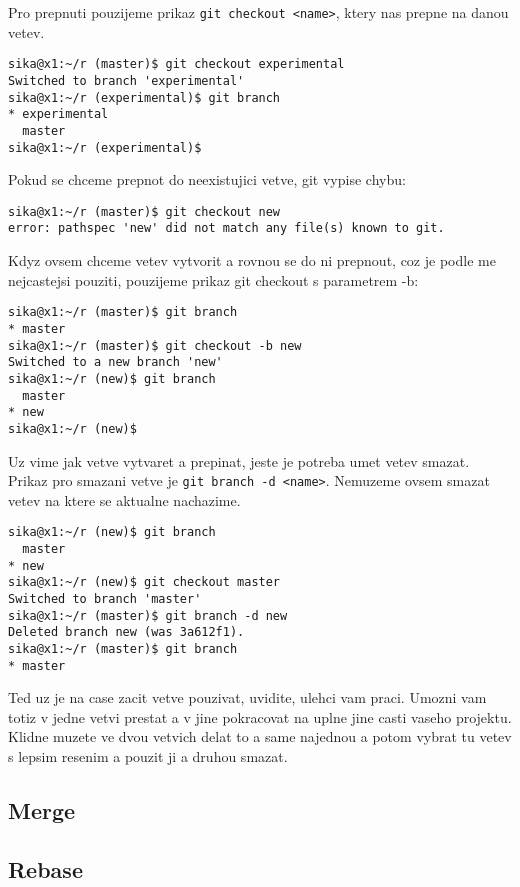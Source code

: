 \documentclass[12pt,a5paper]{article}
\begin{document}
Pro prepnuti pouzijeme prikaz \lstinline|git checkout <name>|, ktery nas prepne na danou vetev.

\begin{lstlisting}
sika@x1:~/r (master)$ git checkout experimental
Switched to branch 'experimental'
sika@x1:~/r (experimental)$ git branch
* experimental
  master
sika@x1:~/r (experimental)$
\end{lstlisting}

Pokud se chceme prepnot do neexistujici vetve, git vypise chybu:

\begin{lstlisting}
sika@x1:~/r (master)$ git checkout new
error: pathspec 'new' did not match any file(s) known to git.
\end{lstlisting}

Kdyz ovsem chceme vetev vytvorit a rovnou se do ni prepnout, coz je podle me nejcastejsi pouziti, pouzijeme prikaz git checkout s parametrem -b:

\begin{lstlisting}
sika@x1:~/r (master)$ git branch
* master
sika@x1:~/r (master)$ git checkout -b new
Switched to a new branch 'new'
sika@x1:~/r (new)$ git branch
  master
* new
sika@x1:~/r (new)$
\end{lstlisting}

Uz vime jak vetve vytvaret a prepinat, jeste je potreba umet vetev smazat. Prikaz pro smazani vetve je \lstinline|git branch -d <name>|. Nemuzeme ovsem smazat vetev na ktere se aktualne nachazime.

\begin{lstlisting}
sika@x1:~/r (new)$ git branch
  master
* new
sika@x1:~/r (new)$ git checkout master
Switched to branch 'master'
sika@x1:~/r (master)$ git branch -d new
Deleted branch new (was 3a612f1).
sika@x1:~/r (master)$ git branch
* master
\end{lstlisting}

Ted uz je na case zacit vetve pouzivat, uvidite, ulehci vam praci. Umozni vam totiz v jedne vetvi prestat a v jine pokracovat na uplne jine casti vaseho projektu. Klidne muzete ve dvou vetvich delat to a same najednou a potom vybrat tu vetev s lepsim resenim a pouzit ji a druhou smazat.


\subsection{Merge}
\subsection{Rebase}
\end{document}
